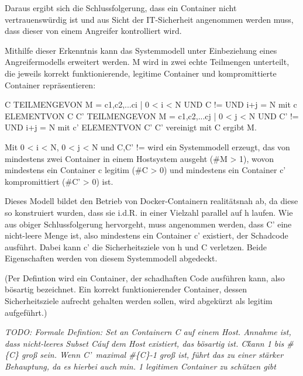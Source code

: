 \documentclass[../main.tex]{subfiles}
\begin{document}
    Daraus ergibt sich die Schlussfolgerung, dass ein Container nicht vertrauenswürdig ist und aus Sicht der IT-Sicherheit angenommen werden muss, dass dieser von einem Angreifer kontrolliert wird.

    Mithilfe dieser Erkenntnis kann das Systemmodell unter Einbeziehung eines Angreifermodells erweitert werden. M wird in zwei echte Teilmengen unterteilt, die jeweils korrekt funktionierende, legitime Container und kompromittierte Container repräsentieren:

    C TEILMENGEVON M = {c1,c2,...ci | 0 < i < N UND C != {} UND i+j = N} mit c ELEMENTVON C     %
    C' TEILMENGEVON M = {c1,c2,...cj | 0 < j < N UND C' != {} UND i+j = N} mit c' ELEMENTVON C'    %
    C' vereinigt mit C ergibt M.

    Mit 0 < i < N, 0 < j < N und {C,C'} != {} wird ein Systemmodell erzeugt, das von mindestens zwei Container in einem Hostsystem ausgeht (#{M} > 1), wovon mindestens ein Container c legitim (#{C} > 0) und mindestens ein Container c' kompromittiert (#{C'} > 0) ist.

    Dieses Modell bildet den Betrieb von Docker-Containern realitätsnah ab, da diese so konstruiert wurden, dass sie i.d.R. in einer Vielzahl parallel auf h laufen. Wie aus obiger Schlussfolgerung hervorgeht, muss angenommen werden, dass C' eine nicht-leere Menge ist, also mindestens ein Container c' existiert, der Schadcode ausführt. Dabei kann c' die Sicherheitsziele von h und C verletzen. Beide Eigenschaften werden von diesem Systemmodell abgedeckt.



    (Per Defintion wird ein Container, der schadhaften Code ausführen kann, also bösartig bezeichnet. Ein korrekt funktionierender Container, dessen Sicherheitsziele aufrecht gehalten werden sollen, wird abgekürzt als legitim aufgeführt.)

    \emph{TODO: Formale Defintion: Set an Containern C auf einem Host. Annahme ist, dass nicht-leeres Subset C\' auf dem Host existiert, das bösartig ist. C\' kann 1 bis \#\{C\} groß sein. Wenn C'\ maximal \#\{C\}-1 groß ist, führt das zu einer stärker Behauptung, da es hierbei auch min. 1 legitimen Container zu schützen gibt}
\end{document}
